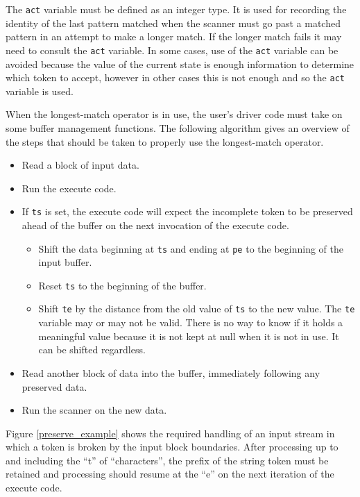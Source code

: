 \documentclass[letterpaper,11pt,oneside]{book}
\begin{document}
The \verb|act| variable must be defined as an integer type. It is used for
recording the identity of the last pattern matched when the scanner must go
past a matched pattern in an attempt to make a longer match. If the longer
match fails it may need to consult the \verb|act| variable. In some cases, use 
of the \verb|act|
variable can be avoided because the value of the current state is enough
information to determine which token to accept, however in other cases this is
not enough and so the \verb|act| variable is used. 

When the longest-match operator is in use, the user's driver code must take on
some buffer management functions. The following algorithm gives an overview of
the steps that should be taken to properly use the longest-match operator.

\begin{itemize}
\setlength{\parskip}{0pt}
\item Read a block of input data.
\item Run the execute code.
\item If \verb|ts| is set, the execute code will expect the incomplete
token to be preserved ahead of the buffer on the next invocation of the execute
code.  
\begin{itemize}
\item Shift the data beginning at \verb|ts| and ending at \verb|pe| to the
beginning of the input buffer.
\item Reset \verb|ts| to the beginning of the buffer. 
\item Shift \verb|te| by the distance from the old value of \verb|ts|
to the new value. The \verb|te| variable may or may not be valid.  There is
no way to know if it holds a meaningful value because it is not kept at null
when it is not in use. It can be shifted regardless.
\end{itemize}
\item Read another block of data into the buffer, immediately following any
preserved data.
\item Run the scanner on the new data.
\end{itemize}

Figure \ref{preserve_example} shows the required handling of an input stream in
which a token is broken by the input block boundaries. After processing up to
and including the ``t'' of ``characters'', the prefix of the string token must be
retained and processing should resume at the ``e'' on the next iteration of
the execute code.
\end{document}
